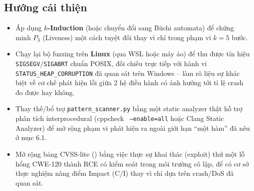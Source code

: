 \subsection{Hướng cải thiện}

\begin{itemize}
  \item Áp dụng \textbf{$k$-Induction} (hoặc chuyển đổi sang Büchi automata) để chứng minh $P_3$ (Liveness) một cách tuyệt đối thay vì chỉ trong phạm vi $k=5$ bước.
  \item Chạy lại bộ fuzzing trên \textbf{Linux} (qua WSL hoặc máy ảo) để thu được tín hiệu \texttt{SIGSEGV}/\texttt{SIGABRT} chuẩn POSIX, đối chiếu trực tiếp với hành vi \texttt{STATUS\_HEAP\_CORRUPTION} đã quan sát trên Windows -- làm rõ liệu sự khác biệt về cơ chế phát hiện lỗi giữa 2 hệ điều hành có ảnh hưởng tới tỉ lệ crash đo được hay không.
  \item Thay thế/bổ trợ \texttt{pattern\_scanner.py} bằng một static analyzer thật hỗ trợ phân tích interprocedural (cppcheck~\cite{cppcheck} \texttt{--enable=all} hoặc Clang Static Analyzer) để mở rộng phạm vi phát hiện ra ngoài giới hạn ``một hàm'' đã nêu ở mục 6.1.
  \item Mở rộng bảng CVSS-lite () bằng việc thực sự khai thác (exploit) thử một lỗ hổng CWE-120 thành RCE có kiểm soát trong môi trường cô lập, để có cơ sở thực nghiệm nâng điểm Impact (C/I) thay vì chỉ dựa trên crash/DoS đã quan sát.
\end{itemize}
